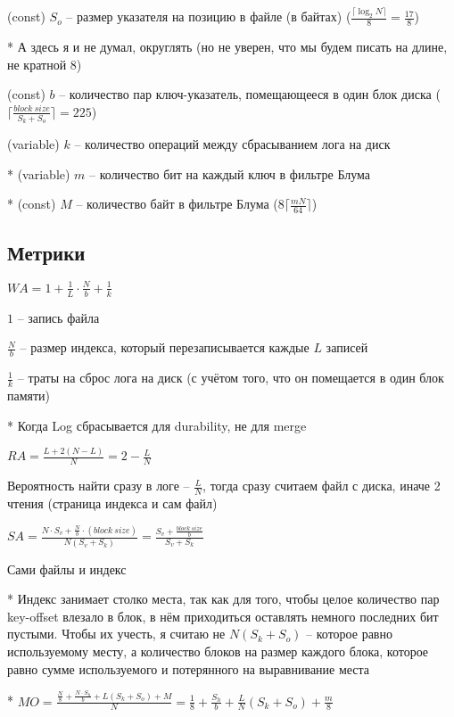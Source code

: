 (const) $S_o$ -- размер указателя на позицию в файле (в байтах) ($ \frac{\lceil\log_2N\rceil}{8} = \frac{17}{8}$)

* А здесь я и не думал, округлять (но не уверен, что мы будем писать на длине, не кратной 8)

(const) $b$ -- количество пар ключ-указатель, помещающееся в один блок диска ($\lceil\frac{block\ size}{S_k + S_o}\rceil = 225$)

(variable) $k$ -- количество операций между сбрасыванием лога на диск

* (variable) $m$ -- количество бит на каждый ключ в фильтре Блума

* (const) $M$ -- количество байт в фильтре Блума ($8\lceil\frac{mN}{64}\rceil$)

\subsection*{Метрики}

\large$WA = 1 + \frac{1}{L}\cdot\frac{N}{b} + \frac{1}{k}$\normalsize

$1$ -- запись файла

$\frac{N}{b}$ -- размер индекса, который перезаписывается каждые $L$ записей

$\frac{1}{k}$ -- траты на сброс лога на диск (с учётом того, что он помещается в один блок памяти)

* Когда Log сбрасывается для durability, не для merge

\large$RA = \frac{L + 2(N-L)}{N} = 2 - \frac{L}{N}$\normalsize

Вероятность найти сразу в логе -- $\frac{L}{N}$, тогда сразу считаем файл с диска, иначе 2 чтения (страница индекса и сам файл)

\large$SA = \frac{N\cdot S_v + \frac{N}{b}\cdot (block\ size)}{N(S_v + S_k)} = \frac{S_v + \frac{block\ size}{b}}{S_v + S_k}$\normalsize

Сами файлы и индекс

* Индекс занимает столко места, так как для того, чтобы целое количество пар key-offset влезало в блок, в нём приходиться оставлять немного последних бит пустыми. Чтобы их учесть, я считаю не $N(S_k + S_o)$ -- которое равно используемому месту, а количество блоков на размер каждого блока, которое равно сумме используемого и потерянного на выравнивание места

* \large$MO = \frac{\frac{N}{8} + \frac{N\cdot S_h}{b} + L(S_k + S_o) + M}{N} = \frac{1}{8} + \frac{S_h}{b} + \frac{L}{N}(S_k + S_o) + \frac{m}{8}$\normalsize

